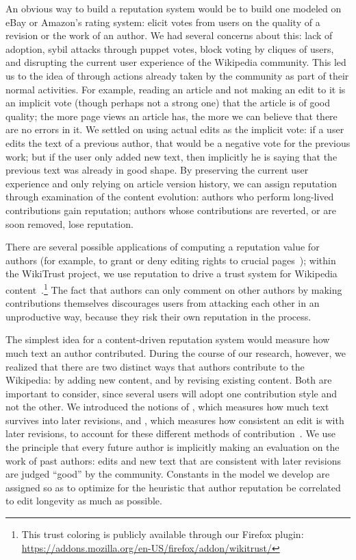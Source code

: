 An obvious way to build a reputation system would be to build one
modeled on eBay or Amazon's rating system: elicit votes from users
on the quality of a revision or the work of an author.
We had several concerns about this: lack of adoption, sybil attacks
through puppet votes, block voting by cliques of users, and
disrupting the current user experience of the Wikipedia community.
This led us to the idea of  through
actions already taken by the community as part of their normal activities.
For example, reading an article and not making an edit to it is
an implicit vote (though perhaps not a strong one)
that the article is of good quality; the more page views an article
has, the more we can believe that there are no errors in it.
We settled on using actual edits as the implicit vote: if a
user edits the text of a previous author, that would be a
negative vote for the previous work; but if the user only added
new text, then implicitly he is saying that the previous text
was already in good shape.
By preserving the current user experience and only
relying on article version history, we can assign reputation
through examination of the content evolution:
authors who perform long-lived contributions gain reputation; authors
whose contributions are reverted, or are soon removed, lose reputation.

There are several possible applications of computing a reputation
value for authors (for example, to grant or deny editing rights to
crucial pages~\cite{Blaze1996}); within the WikiTrust project,
we use reputation to drive a trust system for
Wikipedia content~\cite{Adler2008b}.\footnote{This trust coloring
is publicly available through our Firefox plugin:
\url{https://addons.mozilla.org/en-US/firefox/addon/wikitrust/}}
The fact that authors can only comment on other authors by
making contributions themselves discourages users from attacking
each other in an unproductive way, because they risk their own reputation in the process.


The simplest idea for a content-driven reputation system would measure
how much text an author contributed.
During the course of our research, however, we realized that there are
two distinct ways that authors contribute to the Wikipedia: by adding
new content, and by revising existing content.
Both are important to consider, since several users will
adopt one contribution style and not the other.
We introduced the notions of
, which measures how much text survives
into later revisions, and , which measures
how consistent an edit is with later revisions,
to account for these different methods of contribution~\cite{Adler2007}.
We use the principle that every future author is
implicitly making an evaluation on the work of past authors:
edits and new text that are consistent with later revisions
are judged ``good'' by the community.
Constants in the model we develop are assigned so as to optimize
for the heuristic that author reputation
be correlated to edit longevity as much as possible.



